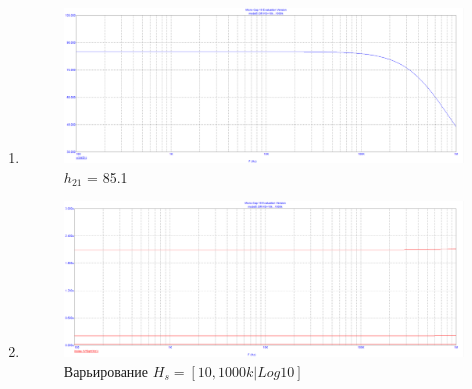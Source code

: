 \documentclass[a4paper, 12pt]{article}%
\begin{document}
\begin{enumerate}

\FloatBarrier
\item
\FloatBarrier
\begin{figure}
    \centering
    \includegraphics[scale=0.225]{images/mod5_1_1.png}
    \caption{$h_{21}$ = 85.1}
    \label{fig:m511}
\end{figure}
\FloatBarrier
\item
\FloatBarrier
\begin{figure}[h!]
    \centering
    \includegraphics[scale=0.225]{images/mod5_1_2_1.png}
    \caption{Варьирование $H_s = [10, 1000k|Log10]$}
    \label{fig:m5121}
\end{figure}


\end{enumerate}
\end{document}
